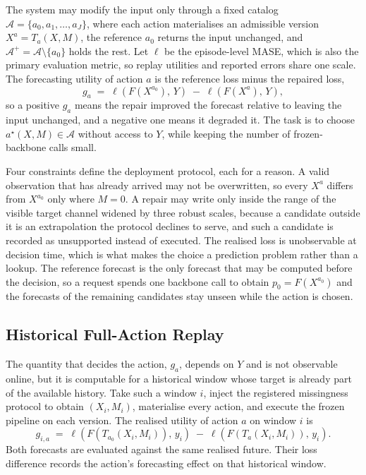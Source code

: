 \documentclass{article}
\newcommand{\calA}{\mathcal{A}}
\newcommand{\loss}{\ell}
\begin{document}
The system may modify the input only through a fixed catalog
$\calA = \{a_0, a_1, \dots, a_J\}$, where each action materialises an admissible version
$X^{a} = T_a(X, M)$, the reference $a_0$ returns the input unchanged, and
$\calA^{+} = \calA \setminus \{a_0\}$ holds the rest. Let $\loss$ be the episode-level MASE,
which is also the primary evaluation metric, so replay utilities and reported errors share one
scale. The forecasting utility of action $a$ is the reference loss minus the repaired loss,
\begin{equation}
  g_a \;=\; \loss\!\left(F(X^{a_0}),\, Y\right) \;-\; \loss\!\left(F(X^{a}),\, Y\right),
  \label{eq:utility}
\end{equation}
so a positive $g_a$ means the repair improved the forecast relative to leaving the input
unchanged, and a negative one means it degraded it. The task is to choose
$a^\star(X, M) \in \calA$ without access to $Y$, while keeping the
number of frozen-backbone calls small.

Four constraints define the deployment protocol, each for a reason. A valid observation that
has already arrived may not be overwritten, so every $X^{a}$ differs from $X^{a_0}$ only where
$M = 0$. A repair may write only inside the range of the visible target channel widened by
three robust scales, because a candidate outside it is an extrapolation the protocol declines
to serve, and such a candidate is recorded as unsupported instead of executed. The realised
loss is unobservable at decision time, which is what makes the choice a prediction problem
rather than a lookup. The reference forecast is the only forecast that may be computed before
the decision, so a request spends one backbone call to obtain $p_0 = F(X^{a_0})$ and the
forecasts of the remaining candidates stay unseen while the action is chosen.

\subsection{Historical Full-Action Replay}
\label{sec:method-replay}
The quantity that decides the action, $g_a$, depends on $Y$ and is not observable online, but it
is computable for a historical window whose target is already part of the available history.
Take such a window $i$, inject the registered missingness protocol to obtain $(X_i, M_i)$,
materialise every action, and execute the frozen pipeline on each version. The realised utility
of action $a$ on window $i$ is
\begin{equation}
  g_{i,a} \;=\; \loss\!\left(F(T_{a_0}(X_i, M_i)),\, y_i\right)
  \;-\; \loss\!\left(F(T_{a}(X_i, M_i)),\, y_i\right).
  \label{eq:replay-gain}
\end{equation}
Both forecasts are evaluated against the same realised future. Their loss difference records
the action's forecasting effect on that historical window.
\end{document}
